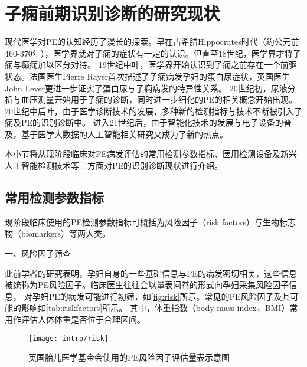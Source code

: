 \section{子痫前期识别诊断的研究现状}
现代医学对PE的认知经历了漫长的探索\cite{BJOG2016}。早在古希腊Hippocrates时代（约公元前460-370年），医学界就对子痫的症状有一定的认识。但直至18世纪，医学界才将子痫与癫痫加以区分对待。
19世纪中叶，医学界开始认识到子痫之前存在一个前驱状态。法国医生Pierre Rayer首次描述了子痫病发孕妇的蛋白尿症状，英国医生John Lever更进一步证实了蛋白尿与子痫病发的特异性关系。
20世纪初，尿液分析与血压测量开始用于子痫的诊断，同时进一步细化的PE的相关概念开始出现。20世纪中后叶，由于医学诊断技术的发展，多种新的检测指标与技术不断被引入子痫及PE的识别诊断中。
进入21世纪后，由于智能化技术的发展与电子设备的普及，基于医学大数据的人工智能相关研究又成为了新的热点。

本小节将从现阶段临床对PE病发评估的常用检测参数指标、医用检测设备及新兴人工智能检测技术等三方面对PE的识别诊断现状进行介绍。

\subsection{常用检测参数指标}
现阶段临床使用的PE检测参数指标可概括为风险因子（risk factors）与生物标志物（biomarkers）等两大类。

一、风险因子筛查

此前学者的研究表明，孕妇自身的一些基础信息与PE的病发密切相关，这些信息被统称为PE风险因子\cite{Magee2008,FIGO,Lowe2015,Heazell2010}。临床医生往往会以量表问卷的形式向孕妇采集风险因子信息，
对孕妇PE的病发可能进行初筛\cite{risks}，如\autoref{fig:risk}所示。常见的PE风险因子及其可能的影响如\autoref{tab:riskfactors}所示。
其中，体重指数（body mass index，BMI）常用作评估人体体重是否位于合理区间。
\begin{figure}[htbp]
    \centering
    \texttt{[image: intro/risk]}
    \caption[英国胎儿医学基金会使用的PE风险因子评估量表示意图]{\label{fig:risk}英国胎儿医学基金会使用的PE风险因子评估量表示意图\cite{risks}}
\end{figure}

